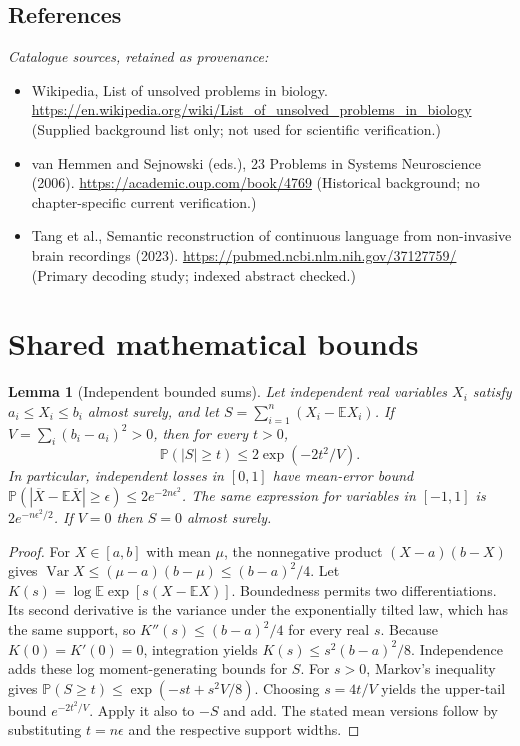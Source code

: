 \documentclass[11pt]{article}
\newcommand{\E}{\mathbb E}
\newcommand{\Prob}{\mathbb P}
\DeclareMathOperator{\Var}{Var}
\providecommand{\E}{\mathbb E}
\providecommand{\Prob}{\mathbb P}
\providecommand{\Var}{\operatorname{Var}}
\newtheorem{sharedlemma}{Lemma}[section]
\begin{document}
\subsection{References}
\noindent\emph{Catalogue sources, retained as provenance:}
\begin{itemize}
\item Wikipedia, List of unsolved problems in biology. \url{https://en.wikipedia.org/wiki/List_of_unsolved_problems_in_biology} (Supplied background list only; not used for scientific verification.)
\item van Hemmen and Sejnowski (eds.), 23 Problems in Systems Neuroscience (2006). \url{https://academic.oup.com/book/4769} (Historical background; no chapter-specific current verification.)
\item Tang et al., Semantic reconstruction of continuous language from non-invasive brain recordings (2023). \url{https://pubmed.ncbi.nlm.nih.gov/37127759/} (Primary decoding study; indexed abstract checked.)
\end{itemize}
\clearpage


\appendix
\section{Shared mathematical bounds}\label{app:bounds}
\begin{sharedlemma}[Independent bounded sums]\label{lem:bounded}
Let independent real variables $X_i$ satisfy $a_i\leq X_i\leq b_i$ almost surely,
and let $S=\sum_{i=1}^n(X_i-\E X_i)$. If
$V=\sum_i(b_i-a_i)^2>0$, then for every $t>0$,
\[
 \Prob(|S|\geq t)\leq 2\exp(-2t^2/V).
\]
In particular, independent losses in $[0,1]$ have mean-error bound
$\Prob(|\overline X-\E\overline X|\geq\epsilon)
\leq2e^{-2n\epsilon^2}$. The same expression for variables in $[-1,1]$
is $2e^{-n\epsilon^2/2}$. If $V=0$ then $S=0$ almost surely.
\end{sharedlemma}
\begin{proof}
For $X\in[a,b]$ with mean $\mu$, the nonnegative product
$(X-a)(b-X)$ gives
$\Var X\leq(\mu-a)(b-\mu)\leq(b-a)^2/4$.
Let $K(s)=\log\E\exp[s(X-\E X)]$.
Boundedness permits two differentiations. Its second derivative is the variance
under the exponentially tilted law, which has the same support, so
$K''(s)\leq(b-a)^2/4$ for every real $s$.
Because $K(0)=K'(0)=0$, integration yields
$K(s)\leq s^2(b-a)^2/8$.
Independence adds these log moment-generating bounds for $S$.
For $s>0$, Markov's inequality gives
$\Prob(S\geq t)\leq\exp(-st+s^2V/8)$.
Choosing $s=4t/V$ yields the upper-tail bound $e^{-2t^2/V}$.
Apply it also to $-S$ and add. The stated mean versions follow by substituting
$t=n\epsilon$ and the respective support widths.
\end{proof}
\end{document}
